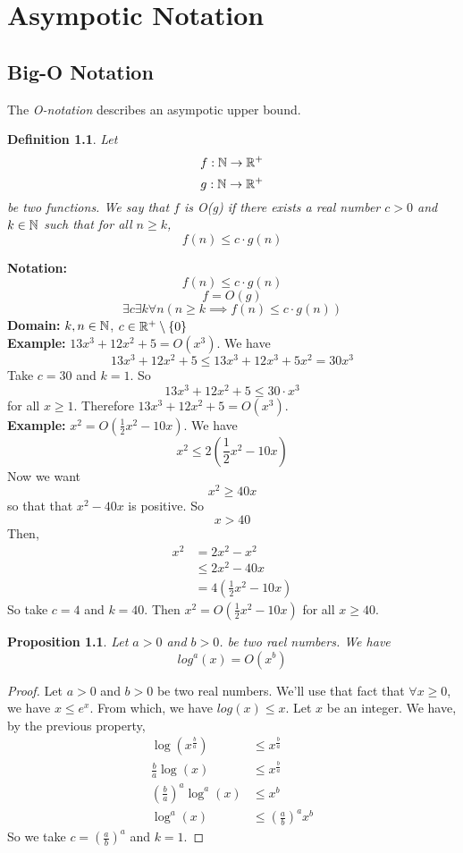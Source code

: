 \documentclass[openany]{report}
\newtheorem{definition}{Definition}[section]
\newtheorem{prop}{Proposition}[section]
\begin{document}
\chapter{Asympotic Notation}

\section{Big-O Notation}
The \emph{O-notation} describes an asympotic upper bound.
\begin{definition}
    Let 
    \[f: \mathbb{N} \rightarrow \mathbb{R}^+\]
    \[g: \mathbb{N} \rightarrow \mathbb{R}^+\]
    be two functions. We say that $f$ is \emph{O(g)} if there exists a real number $c > 0$ and $k \in \mathbb{N}$ such that for all $n \geq k$, 
    \[f(n) \leq c \cdot g(n)\]
\end{definition} 
\noindent
\textbf{Notation:}
\[f(n) \leq c \cdot g(n)\]
\[f = O(g)\]
\[\exists c\exists k \forall n (n \geq k \implies f(n) \leq c \cdot g(n))\]
\textbf{Domain:} $k, n \in \mathbb{N}$, $c \in \mathbb{R}^+ \setminus \{0\}$\\[3ex]
\noindent
\textbf{Example:} $13x^3 + 12x^2 + 5 = O(x^3)$. We have
\[13x^3 + 12x^2 + 5 \leq 13x^3 + 12x^3 + 5x^2 = 30x^3\]
Take $c = 30$ and $k = 1$. So 
\[13x^3 + 12x^2 + 5 \leq 30 \cdot x^3 \]
for all $x \geq 1$. Therefore $13x^3 + 12x^2 + 5 = O(x^3)$. \\[3ex]
\textbf{Example:} $x^2 = O\left(\frac{1}{2}x^2 - 10x\right)$. We have 
\[x^2 \leq 2 \left(\frac{1}{2}x^2 - 10x\right)\]
Now we want 
\[x^2 \geq 40x\]
so that that $x^2 - 40x$ is positive. So
\[x > 40\]
Then, 
\begin{align*}
    x^2 &= 2x^2 - x^2\\
    &\leq 2x^2 - 40x\\
    &= 4\left(\frac{1}{2}x^2 - 10x\right)
\end{align*}
So take $c = 4$ and $k = 40$. Then $x^2 = O\left(\frac{1}{2}x^2 - 10x\right)$ for all $x \geq 40$.


\begin{prop}
    Let $a > 0$ and $b > 0$. be two rael numbers. We have 
    \[log^a(x) = O(x^b)\]
\end{prop}
\begin{proof}
    Let $a > 0$ and $b > 0$ be two real numbers. We'll use that fact that $\forall x \geq 0$, we have $x \leq e^x$. From which, we have $log(x) \leq x$. Let $x$ be an integer. We have, by the previous property, 
    \begin{align*}
        \log(x^{\frac{b}{a}}) &\leq x^{\frac{b}{a}}\\
        \frac{b}{a}\log(x) &\leq x^{\frac{b}{a}}\\
        \left(\frac{b}{a}\right)^a \log^a(x) &\leq x^b\\
        \log^a(x) &\leq \left(\frac{a}{b}\right)^ax^b
    \end{align*}
    So we take $c = \left(\frac{a}{b}\right)^a$ and $k = 1$.
\end{proof}
\end{document}
